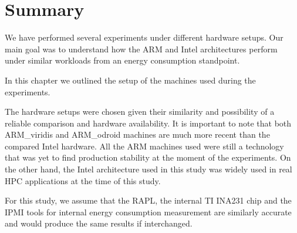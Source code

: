 \clearpage 

\section{Summary}

We have performed several experiments under different hardware setups. 
Our main goal was to understand how the ARM and Intel architectures
perform under similar workloads from an energy consumption standpoint.

In this chapter we outlined the setup of the machines used during the experiments.

The hardware setups were chosen given their similarity and possibility of a reliable comparison and hardware availability. It is important to note that both ARM\_viridis and ARM\_odroid machines are much more recent than the compared Intel
hardware. All the ARM machines used were still a technology that was yet to find production
stability at the moment of the experiments. On the other hand, the Intel architecture used in this study was widely used in real HPC applications at the time of this study.

For this study, we assume that the RAPL, the internal TI INA231 chip and the IPMI tools for internal energy
consumption measurement are similarly accurate and would produce the same results if interchanged. 

